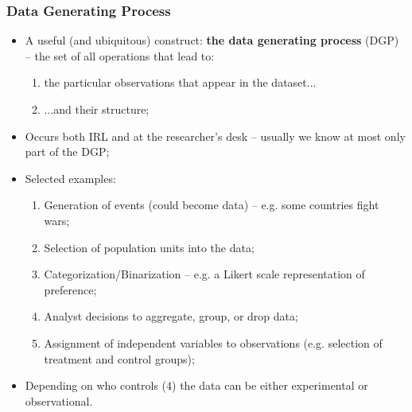 \documentclass[aspectratio=169]{beamer}
\theoremstyle{principle}
\begin{document}
\begin{frame}
\frametitle{Data Generating Process}

\begin{itemize}
\item A useful (and ubiquitous) construct: \textbf{the data generating process} (DGP) -- the set of all operations that lead to:
\begin{enumerate}
\item the particular observations that appear in the dataset...
\item ...and their structure;
\end{enumerate}
\bigskip
\item Occurs both IRL and at the researcher's desk -- usually we know at most only part of the DGP;
\bigskip
\item Selected examples:
\begin{enumerate}
\item Generation of events (could become data) -- e.g. some countries fight wars;
\item Selection of population units into the data;
\item Categorization/Binarization -- e.g. a Likert scale representation of preference;
\item Analyst decisions to aggregate, group, or drop data;
\item Assignment of independent variables to observations (e.g. selection of treatment and control groups);
\end{enumerate}
\bigskip
\item[] \color{white}Depending on who controls (4) the data can be either experimental or observational.
\end{itemize}

\end{frame}
\end{document}

